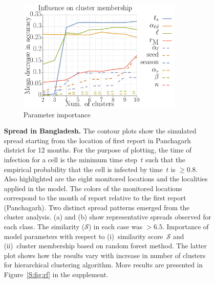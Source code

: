 \documentclass[11pt]{article}
\newcommand{\similarity}{\mathcal{S}}
\theoremstyle{definition}
\begin{document}
\begin{figure}[t]
\begin{subfigure}[b]{.32\textwidth}
    \includegraphics[width=0.9\textwidth]{../clustering/results/agglomerative/rf_k_agglomerative_mse.pdf}
    \caption{Parameter importance \label{fig:rf}}
\end{subfigure}
\caption{\textbf{Spread in Bangladesh.} The contour plots show the simulated
spread starting from the location of first report in Panchagarh district
for 12 months. For the purpose of plotting, the time of infection for a
cell is the minimum time step~$t$ such that the empirical probability that
the cell is infected by time~$t$ is $\ge0.8$. Also highlighted are the
eight monitored locations and the localities applied in the model. The
colors of the monitored locations correspond to the month of report
relative to the first report (Panchagarh). Two distinct spread patterns
emerged from the cluster analysis. (a) and (b) show representative spreads
observed for each class. The similarity ($\similarity$) in each case was
$>6.5$. Importance of model parameters with respect to (i)~similarity
score~$\similarity$ and (ii)~cluster membership based on random forest
method. The latter plot shows how the results vary with increase in number
of clusters for hierarchical clustering algorithm. More results are
presented in Figure~\ref{S:fig:rf} in the supplement.}
\end{figure}
\end{document}
